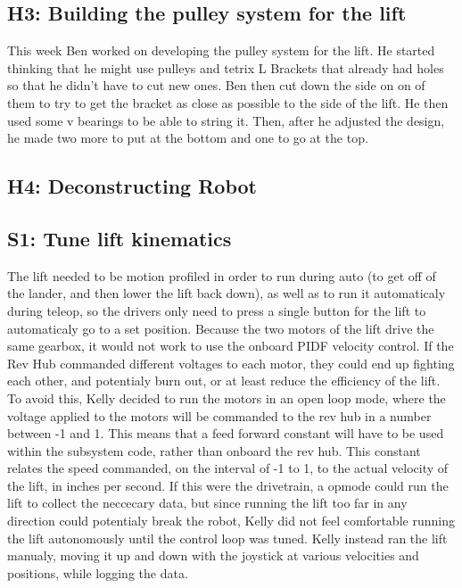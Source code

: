 \documentclass{article}
\begin{document}
\subsection{H3: Building the pulley system for the lift}


This week Ben worked on developing the pulley system for the lift. He started thinking that he might use pulleys and tetrix L Brackets that already had holes so that he didn't have to cut new ones. Ben then cut down the side on on of them to try to get the bracket as close as possible to the side of the lift. He then used some v bearings to be able to string it. Then, after he adjusted the design, he made two more to put at the bottom and one to go at the top.

\subsection{H4: Deconstructing Robot}
 \subsection{S1: Tune lift kinematics}

The lift needed to be motion profiled in order to run during auto (to get off of the lander, and then lower the lift back down), as well as to run it automaticaly during teleop, so the drivers only need to press a single button for the lift to automaticaly go to a set position. Because the two motors of the lift drive the same gearbox, it would not work to use the onboard PIDF velocity control. If the Rev Hub commanded different voltages to each motor, they could end up fighting each other, and potentialy burn out, or at least reduce the efficiency of the lift. To avoid this, Kelly decided to run the motors in an open loop mode, where the voltage applied to the motors will be commanded to the rev hub in a number between -1 and 1. This means that a feed forward constant will have to be used within the subsystem code, rather than onboard the rev hub. This constant relates the speed commanded, on the interval of -1 to 1, to the actual velocity of the lift, in inches per second. If this were the drivetrain, a opmode could run the lift to collect the neccecary data, but since running the lift too far in any direction could potentialy break the robot, Kelly did not feel comfortable running the lift autonomously until the control loop was tuned. Kelly instead ran the lift manualy, moving it up and down with the joystick at various velocities and positions, while logging the data. 
\end{document}
